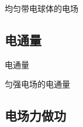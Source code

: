 \documentclass[UTF8]{ctexart}
\begin{document}
        \begin{xmp}
            {均匀带电球体的电场}
        \end{xmp}

    \subsection{电通量}
        
        \begin{dfn}
            {电通量}
        \end{dfn}
        
        \begin{ppt}
            {匀强电场的电通量}
        \end{ppt}

    \subsection{电场力做功}
\end{document}
